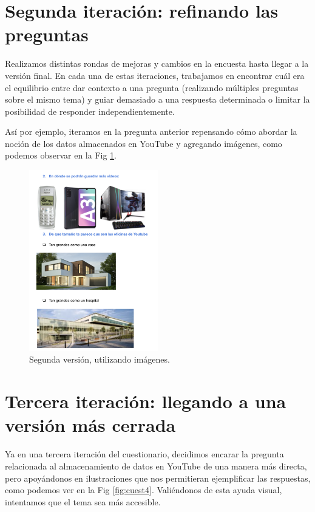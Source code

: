 \section{Segunda iteración: refinando las preguntas}

Realizamos distintas rondas de mejoras y cambios en la encuesta hasta llegar a la versión final. En cada una de estas iteraciones, trabajamos en encontrar cuál era el equilibrio entre dar contexto a una pregunta (realizando múltiples preguntas sobre el mismo tema) y guiar demasiado a una respuesta determinada o limitar la posibilidad de responder independientemente.  

Así por ejemplo, iteramos en la pregunta anterior repensando cómo abordar la noción de los datos almacenados en YouTube y agregando imágenes, como podemos observar en la Fig \ref{fig:cuest3}.

\begin{figure}[h]
    \centering
    \includegraphics[width=0.5\textwidth]{images/3.png}
    \caption{Segunda versión, utilizando imágenes.}
    \label{fig:cuest3}
\end{figure}

\section{Tercera iteración: llegando a una versión más cerrada}

Ya en una tercera iteración del cuestionario, decidimos encarar la pregunta relacionada al almacenamiento de datos en YouTube de una manera más directa, pero apoyándonos en ilustraciones que nos permitieran ejemplificar las respuestas, como podemos ver en la Fig \ref{fig:cuest4}. Valiéndonos de esta ayuda visual, intentamos que el tema sea más accesible.

